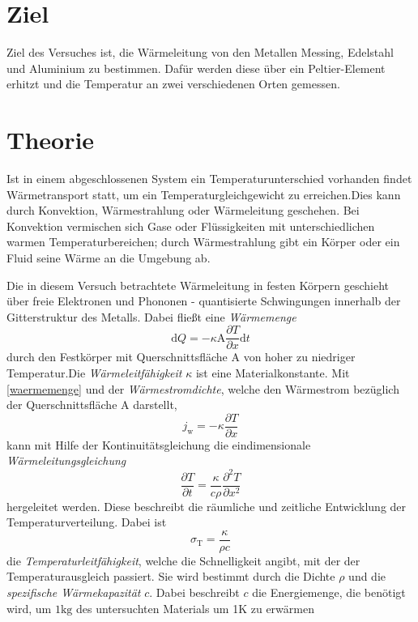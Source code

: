\section{Ziel}
\label{sec:ziel}

Ziel des Versuches ist, die Wärmeleitung von den Metallen Messing, Edelstahl und Aluminium zu bestimmen. Dafür werden diese über ein Peltier-Element erhitzt und die Temperatur an zwei verschiedenen Orten gemessen.

\section{Theorie}
\label{sec:theorie}

Ist in einem abgeschlossenen System ein Temperaturunterschied vorhanden findet Wärmetransport statt, um ein Temperaturgleichgewicht zu erreichen.Dies kann durch Konvektion, Wärmestrahlung oder Wärmeleitung geschehen. 
Bei Konvektion vermischen sich Gase oder Flüssigkeiten mit unterschiedlichen warmen Temperaturbereichen; durch Wärmestrahlung gibt ein Körper oder ein Fluid seine Wärme an die Umgebung ab.

Die in diesem Versuch betrachtete Wärmeleitung in festen Körpern geschieht über freie Elektronen und Phononen - quantisierte Schwingungen innerhalb der Gitterstruktur des Metalls.
Dabei fließt eine \emph{Wärmemenge} 
\begin{equation}
	\label{waermemenge}
	\mathup{d}Q=-\kappa\mathup{A}\frac{\partial{T}}{\partial{x}}\mathup{d}t
\end{equation}
durch den Festkörper mit Querschnittsfläche A von hoher zu niedriger Temperatur.Die \emph{Wärmeleitfähigkeit} $\kappa$ ist eine Materialkonstante.
Mit \eqref{waermemenge} und der \emph{Wärmestromdichte}, welche den Wärmestrom bezüglich der Querschnittsfläche A darstellt,
\begin{equation}
	\label{waermestromdichte}
	j_\mathup{w}= -\kappa \frac{\partial{T}}{\partial{x}}
\end{equation}
kann mit Hilfe der Kontinuitätsgleichung die eindimensionale \emph{Wärmeleitungsgleichung}
\begin{equation}
	\label{waermeleitungsgleichung}
	\frac{\partial{T}}{\partial{t}} =  \frac{\kappa}{c\rho}\frac{\partial^2{T}}{\partial{x^2}}
\end{equation}
hergeleitet werden.
Diese beschreibt die räumliche und zeitliche Entwicklung der Temperaturverteilung. 
Dabei ist
\begin{equation}
	\label{temperaturleitfähigkeit}
	\sigma_\mathup{T}=\frac{\kappa}{{\rho}c}
\end{equation}
die \emph{Temperaturleitfähigkeit}, welche die Schnelligkeit angibt, mit der der Temperaturausgleich passiert.
Sie wird bestimmt durch die Dichte $\rho$ und die \emph{spezifische Wärmekapazität} $c$. Dabei beschreibt $c$ die Energiemenge, die benötigt wird, um $1\si{\kilo\gram}$ des untersuchten Materials um 1K zu erwärmen

